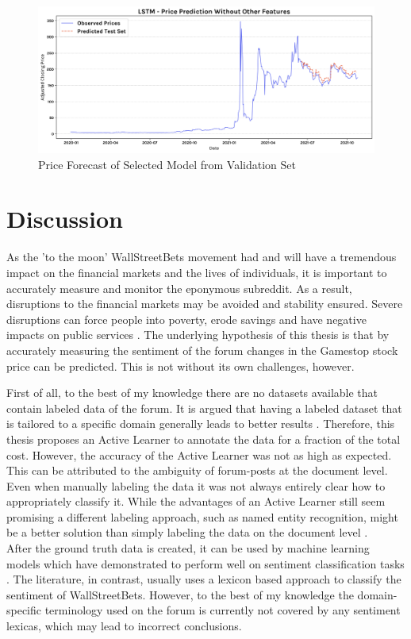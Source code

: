 \documentclass[11pt, a4paper]{article}
\begin{document}
\begin{figure}[!ht]
    \centering
    \includegraphics[scale=0.4]{no_other_feature_pred.png}
    \caption{Price Forecast of Selected Model from Validation Set}
    \label{fig:price_forecast_best_model}
\end{figure}


\newpage
\section{Discussion}

As the 'to the moon' WallStreetBets movement had and will have a tremendous impact on the financial markets
and the lives of individuals, it is important to accurately measure and monitor the eponymous subreddit.
As a result, disruptions to the financial markets may be avoided and stability ensured.
Severe disruptions can force people into poverty, erode savings and have negative impacts on public services \citep{robe2013markets}.
The underlying hypothesis of this thesis is that by accurately measuring the sentiment of the forum changes in the Gamestop stock price can be predicted.
This is not without its own challenges, however.

First of all, to the best of my knowledge there are no datasets available that contain labeled data of the forum. It is
argued that having a labeled dataset that is tailored to a specific domain generally leads to better results \citep{park2015EfficientExtraction}.
Therefore, this thesis proposes an Active Learner to annotate the data for a fraction of the total cost.
However, the accuracy of the Active Learner was not as high as expected.
This can be attributed to the ambiguity of forum-posts at the document level.
Even when manually labeling the data it was not always entirely clear how to appropriately classify it. 
While the advantages of an Active Learner still seem promising a different labeling approach, such as
named entity recognition, might be a better solution than simply labeling the data on the document level \citep{stanislawek2019named}.\\
After the ground truth data is created, it can be used by machine learning models which have demonstrated to perform well on sentiment
classification tasks \citep{Lagrari2021, fu2018lexiconenhancedlstm}.
The literature, in contrast, usually uses a lexicon based approach to classify the sentiment of WallStreetBets.
However, to the best of my knowledge the domain-specific terminology used on the forum is currently not covered by any sentiment lexicas,
which may lead to incorrect conclusions.
\end{document}
